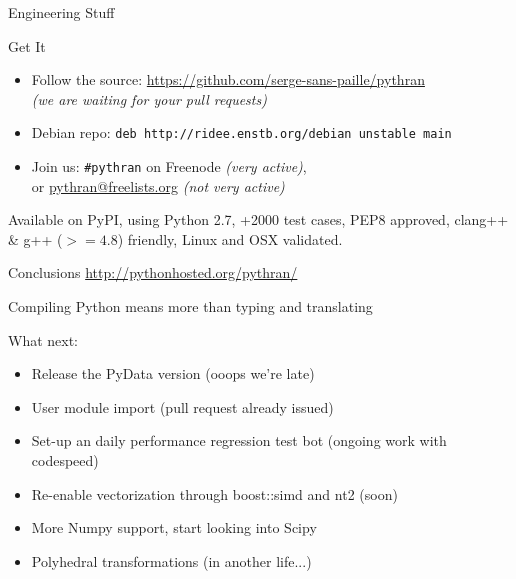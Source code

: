 \documentclass[aspectratio=1610]{beamer}
\begin{document}
\begin{frame}{Engineering Stuff}
    \begin{block}{Get It}
        \begin{itemize}
            \item Follow the source: \url{https://github.com/serge-sans-paille/pythran} \\ \textit{(we are waiting for your pull requests)}
            \item Debian repo: \texttt{deb http://ridee.enstb.org/debian unstable main}
            \item Join us: \texttt{\#pythran} on Freenode 
            \textit{(very active)}, \\ or \url{pythran@freelists.org} 
            \textit{(not very active)}
        \end{itemize}
    \end{block}

    Available on PyPI, using Python 2.7, +2000 test cases, PEP8 approved, clang++ \& g++ ($>=4.8$) friendly, Linux and OSX validated.
\end{frame}

\begin{frame}{Conclusions}
    \hfill\tiny{\url{http://pythonhosted.org/pythran/}}
    \normalsize
    \begin{center}
        \vfill
        Compiling Python means more than typing and translating\\
        \vfill
         {
        What next: 
        \begin{itemize}
          \item<3-> Release the PyData version \scriptsize{(ooops we're late)}
          \item<4-> User module import \scriptsize{(pull request already issued)}
          \item<5-> Set-up an daily performance regression test bot \scriptsize{(ongoing work with codespeed)}
          \item<6-> Re-enable vectorization through boost::simd and nt2 \scriptsize{(soon)}
          \item<7-> More Numpy support, start looking into Scipy
          \item<8-> Polyhedral transformations \scriptsize{(in another life...)}
        \end{itemize}
        }
        \vfill
        \vfill
    \end{center}
\end{frame}
\end{document}
